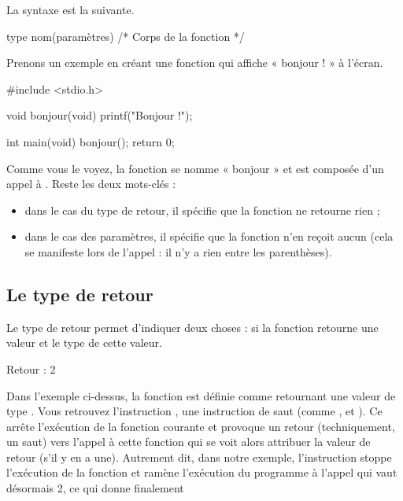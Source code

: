 La syntaxe est la suivante.

\begin{C}
type nom(paramètres)
{
     /* Corps de la fonction */
}
\end{C}

Prenons un exemple en créant une fonction qui affiche « bonjour ! » à
l'écran.

\begin{C}
#include <stdio.h>


void bonjour(void)
{
    printf("Bonjour !\n");
}


int main(void)
{
    bonjour();
    return 0;
}
\end{C}

Comme vous le voyez, la fonction se nomme « bonjour » et est composée
d'un appel à . Reste les deux mots-clés  :

\begin{itemize}
\item
  dans le cas du type de retour, il spécifie que la fonction ne retourne
  rien ;
\item
  dans le cas des paramètres, il spécifie que la fonction n'en reçoit
  aucun (cela se manifeste lors de l'appel : il n'y a rien entre les
  parenthèses).
\end{itemize}

\subsection{Le type de retour}
\label{le-type-de-retour}

Le type de retour permet d'indiquer deux choses : si la fonction
retourne une valeur et le type de cette valeur.

\begin{C}
#include <stdio.h>


int deux(void)
{
    return 2;
}


int main(void)
{
    printf("Retour : %
    return 0;

\end{C}

\begin{C}
Retour : 2
\end{C}

Dans l'exemple ci-dessus, la fonction  est définie comme
retournant une valeur de type . Vous retrouvez l'instruction
, une instruction de saut (comme ,
 et ). Ce  arrête
l'exécution de la fonction courante et provoque un retour
(techniquement, un saut) vers l'appel à cette fonction qui se voit alors
attribuer la valeur de retour (s'il y en a une). Autrement dit, dans
notre exemple, l'instruction  stoppe l'exécution de la
fonction  et ramène l'exécution du programme à l'appel
qui vaut désormais 2, ce qui donne finalement

